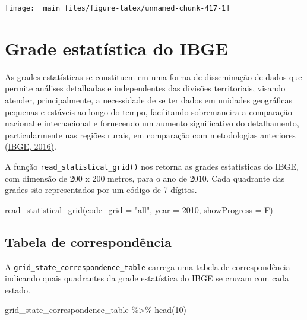 \documentclass[
  brazilian,
]{book}
\newenvironment{Shaded}{\begin{snugshade}}{\end{snugshade}}
\newcommand{\AttributeTok}[1]{\textcolor[rgb]{0.77,0.63,0.00}{#1}}
\newcommand{\DecValTok}[1]{\textcolor[rgb]{0.00,0.00,0.81}{#1}}
\newcommand{\FunctionTok}[1]{\textcolor[rgb]{0.00,0.00,0.00}{#1}}
\newcommand{\NormalTok}[1]{#1}
\newcommand{\SpecialCharTok}[1]{\textcolor[rgb]{0.00,0.00,0.00}{#1}}
\newcommand{\StringTok}[1]{\textcolor[rgb]{0.31,0.60,0.02}{#1}}
\begin{document}
\begin{center}\texttt{[image: \_main\_files/figure-latex/unnamed-chunk-417-1]} \end{center}

\hypertarget{grade-estatuxedstica-do-ibge}{%
\section{Grade estatística do IBGE}\label{grade-estatuxedstica-do-ibge}}

As grades estatísticas se constituem em uma forma de disseminação de dados que
permite análises detalhadas e independentes das divisões territoriais, visando
atender, principalmente, a necessidade de se ter dados em unidades geográficas
pequenas e estáveis ao longo do tempo, facilitando sobremaneira a comparação
nacional e internacional e fornecendo um aumento significativo do detalhamento,
particularmente nas regiões rurais, em comparação com metodologias anteriores \href{https://geoftp.ibge.gov.br/recortes_para_fins_estatisticos/grade_estatistica/censo_2010/grade_estatistica.pdf}{(IBGE, 2016)}.

A função \texttt{read\_statistical\_grid()} nos retorna as grades estatísticas do IBGE, com dimensão de 200 x 200 metros, para o ano de 2010. Cada quadrante das grades são representados por um código de 7 dígitos.

\begin{Shaded}
\begin{Highlighting}[]
\FunctionTok{read\_statistical\_grid}\NormalTok{(}\AttributeTok{code\_grid =} \StringTok{"all"}\NormalTok{,}
                      \AttributeTok{year =} \DecValTok{2010}\NormalTok{,}
                      \AttributeTok{showProgress =}\NormalTok{ F)}
\end{Highlighting}
\end{Shaded}

\hypertarget{tabela-de-corresponduxeancia}{%
\subsection{Tabela de correspondência}\label{tabela-de-corresponduxeancia}}

A \texttt{grid\_state\_correspondence\_table} carrega uma tabela de correspondência indicando quais quadrantes da grade estatística do IBGE se cruzam com cada estado.

\begin{Shaded}
\begin{Highlighting}[]
\NormalTok{grid\_state\_correspondence\_table }\SpecialCharTok{\%\textgreater{}\%} \FunctionTok{head}\NormalTok{(}\DecValTok{10}\NormalTok{)}
\end{Highlighting}
\end{Shaded}
\end{document}

